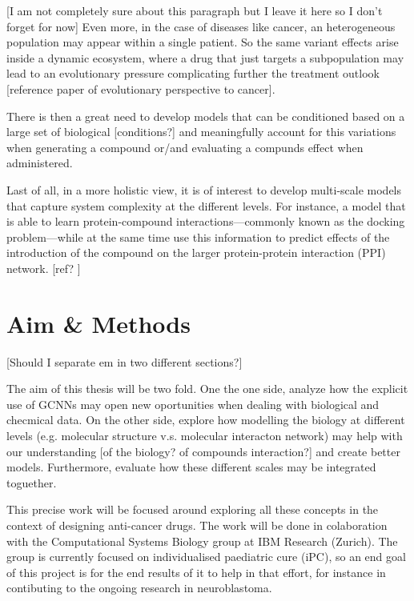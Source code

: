 \documentclass{article}
\begin{document}
[I am not completely sure about this paragraph but I leave it here so I don't forget for
now] Even more, in the case of diseases like cancer, an heterogeneous population may
appear within a single patient. So the same variant effects arise inside a dynamic
ecosystem, where a drug that just targets a subpopulation may lead to an evolutionary
pressure complicating further the treatment outlook [reference paper of evolutionary
perspective to cancer].

There is then a great need to develop models that can be conditioned based on a large
set of biological [conditions?] and meaningfully account for this variations when
generating a compound or/and evaluating a compunds effect when administered.

Last of all, in a more holistic view, it is of interest to develop multi-scale models
that capture system complexity at the different levels. For instance, a model that is
able to learn protein-compound interactions---commonly known as the docking
problem---while at the same time use this information to predict effects of the
introduction of the compound on the larger protein-protein interaction (PPI) network.
[ref? \cite{Sun2019}]

    \section*{Aim \& Methods}
[Should I separate em in two different sections?]

The aim of this thesis will be two fold. One the one side, analyze how the explicit use
of GCNNs may open new oportunities when dealing with biological and checmical data. On
the other side, explore how modelling the biology at different levels (e.g. molecular
structure v.s. molecular interacton network) may help with our understanding [of the
biology? of compounds interaction?] and create better models. Furthermore, evaluate how
these different scales may be integrated toguether.

This precise work will be focused around exploring all these concepts in the context of
designing anti-cancer drugs. The work will be done in colaboration with the
Computational Systems Biology group at IBM Research (Zurich). The group is currently
focused on individualised paediatric cure (iPC), so an end goal of this project is for
the end results of it to help in that effort, for instance in contibuting to the ongoing
research in neuroblastoma.
\end{document}
